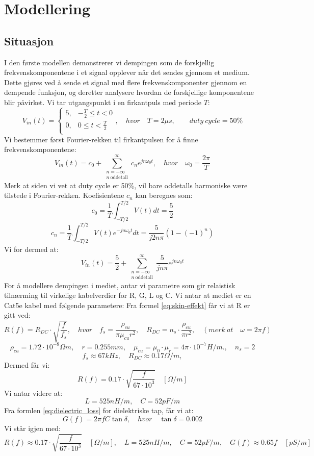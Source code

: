 \section{Modellering}
\subsection{Situasjon}
I den første modellen demonstrerer vi dempingen som de forskjellig frekvenskomponentene i et signal opplever når det sendes gjennom et medium. Dette gjøres ved å sende et signal med flere frekvenskomponenter gjennom en dempende funksjon, og deretter analysere hvordan de forskjellige komponentene blir påvirket.
Vi tar utgangspunkt i en firkantpuls med periode $T$:
\[
    V_{in}(t) = \begin{cases}
        5, & -\frac{T}{2} \leq t < 0 \\
        0, & 0 \leq t < \frac{T}{2} \\
    \end{cases}, \quad hvor \quad T = 2 \mu s,\qquad duty\ cycle = 50\%
\]
Vi bestemmer først Fourier-rekken til firkantpulsen for å finne frekvenskomponentene:
\[
    V_{in}(t) = c_0 + \sum_{\substack{n=-\infty\\ n\ \text{oddetall}}}^{\infty} c_n e^{j n \omega_0 t}, \quad hvor \quad \omega_0 = \frac{2\pi}{T}
\]
Merk at siden vi vet at duty cycle er 50\%, vil bare oddetalls harmoniske være tilstede i Fourier-rekken.
Koefisientene $c_n$ kan beregnes som:
\[
    c_0 = \frac{1}{T} \int_{-T/2}^{T/2} V(t) dt = \frac{5}{2}
\]
\[
    c_n = \frac{1}{T} \int_{-T/2}^{T/2} V(t) e^{-j n \omega_0 t} dt =  \frac{5}{j 2 n \pi} (1 - (-1)^n)
\]
Vi for dermed at:
\[
    V_{in}(t) = \frac{5}{2} + \sum_{\substack{n=-\infty\\ n\ \text{oddetall}}}^{\infty} \frac{5}{j n \pi} e^{j n \omega_0 t}
\]
For å modellere dempingen i mediet, antar vi parametre som gir relaistisk tilnærming til virkelige kabelverdier for R, G, L og C.
Vi antar at mediet er en Cat5e kabel med følgende parametere:
Fra formel \eqref{eq:skin-effekt} får vi at R er gitt ved:
\[
    R(f) = R_{DC} \cdot \sqrt{\frac{f}{f_{s}}}, \quad hvor \quad f_{s} = \frac{\rho_{cu}}{\pi \mu_{cu} r^2}, \quad R_{DC} = n_s \cdot \frac{\rho_{cu}}{\pi r^2}, \quad (merk\ at \quad \omega = 2\pi f)
\]
\[
    \rho_{cu} = 1.72 \cdot 10^{-8} \Omega m, \quad r = 0.255 mm, \quad \mu_{cu} = \mu_0 \cdot \mu_r = 4\pi \cdot 10^{-7} H/m., \quad n_s = 2
\]
\[
    f_s \approx 67kHz, \quad R_{DC} \approx 0.17 \Omega/m,
\]
Dermed får vi:
\[
    R(f) = 0.17 \cdot \sqrt{\frac{f}{67 \cdot 10^3}} \quad [\Omega/m]
\]
Vi antar videre at:
\[
    L = 525 nH/m, \quad C = 52 pF/m
\]
Fra formlen \eqref{eq:dielectric_loss} for dielektriske tap, får vi at:
\[
    G(f) = 2\pi f C \tan \delta, \quad hvor \quad \tan \delta = 0.002
\]
\clearpage
\noindent Vi står igjen med:
\[
    R(f) \approx 0.17 \cdot \sqrt{\frac{f}{67 \cdot 10^3}} \quad [\Omega/m], \quad L = 525 nH/m, \quad C = 52 pF/m, \quad G(f) \approx 0.65f \quad [pS/m]
\]


